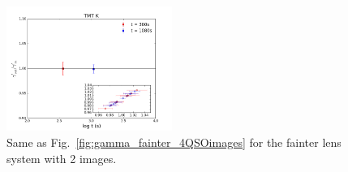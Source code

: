 \documentclass[a4paper,11pt]{article}
\begin{document}
\begin{figure}
\begin{center}
\includegraphics[width=0.48\textwidth]{figures/gamma_135949_anti_2QSOimages_TMT.png}
\end{center}
\caption{Same as Fig.~\ref{fig:gamma_fainter_4QSOimages} for the fainter lens system with 2 images.
\label{fig:gamma_fainter_2QSOimages}}
\end{figure}
\end{document}
